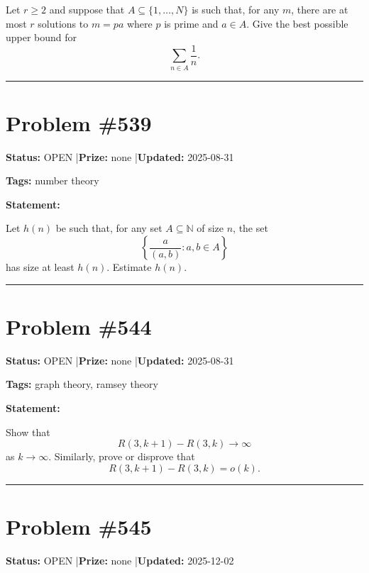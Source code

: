 \documentclass{article}
\begin{document}
Let $r\geq 2$ and suppose that $A\subseteq\{1,\ldots,N\}$ is such that, for any $m$, there are at most $r$ solutions to $m=pa$ where $p$ is prime and $a\in A$. Give the best possible upper bound for\[\sum_{n\in A}\frac{1}{n}.\]

\noindent\rule{\linewidth}{0.4pt}


\section{Problem \#539}
\label{prob:539}

\noindent\textbf{Status:} OPEN \quad|\quad \textbf{Prize:} none \quad|\quad \textbf{Updated:} 2025-08-31

\noindent\textbf{Tags:} number theory

\medskip

\noindent\textbf{Statement:}

Let $h(n)$ be such that, for any set $A\subseteq \mathbb{N}$ of size $n$, the set\[\left\{ \frac{a}{(a,b)}: a,b\in A\right\}\]has size at least $h(n)$. Estimate $h(n)$.

\noindent\rule{\linewidth}{0.4pt}


\section{Problem \#544}
\label{prob:544}

\noindent\textbf{Status:} OPEN \quad|\quad \textbf{Prize:} none \quad|\quad \textbf{Updated:} 2025-08-31

\noindent\textbf{Tags:} graph theory, ramsey theory

\medskip

\noindent\textbf{Statement:}

Show that\[R(3,k+1)-R(3,k)\to\infty\]as $k\to \infty$. Similarly, prove or disprove that\[R(3,k+1)-R(3,k)=o(k).\]

\noindent\rule{\linewidth}{0.4pt}


\section{Problem \#545}
\label{prob:545}

\noindent\textbf{Status:} OPEN \quad|\quad \textbf{Prize:} none \quad|\quad \textbf{Updated:} 2025-12-02
\end{document}
